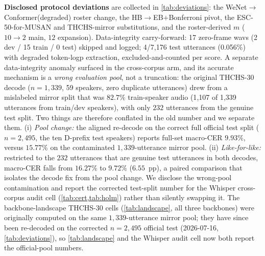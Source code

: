 \documentclass[11pt]{article}
\begin{document}
\textbf{Disclosed protocol deviations} are collected in \cref{tab:deviations}: the
WeNet$\to$Conformer(degraded) roster change, the HB$\to$EB$+$Bonferroni pivot, the
ESC-50-for-MUSAN and THCHS-mirror substitutions, and the roster-derived $m$
($10\to2$ main, $12$ expansion). Data-integrity carry-forward: 17 zero-frame wavs
(2 dev / 15 train / 0 test) skipped and logged; 4/7{,}176 test utterances (0.056\%)
with degraded token-logp extraction, excluded-and-counted per score. A separate
data-integrity anomaly surfaced in the cross-corpus arm, and its accurate mechanism is a
\emph{wrong evaluation pool}, not a truncation: the original THCHS-30 decode ($n=1{,}339$,
59 speakers, zero duplicate utterances) drew from a mislabeled mirror split that was
$82.7\%$ train-speaker audio (1{,}107 of 1{,}339 utterances from train/dev speakers),
with only $232$ utterances from the genuine test split. Two things are therefore
conflated in the old number and we separate them. (i) \emph{Pool change:} the aligned
re-decode on the correct full official test split ($n=2{,}495$, the ten D-prefix test
speakers) reports full-set macro-CER $9.93\%$, versus $15.77\%$ on the contaminated
$1{,}339$-utterance mirror pool. (ii) \emph{Like-for-like:} restricted to the $232$
utterances that are genuine test utterances in both decodes, macro-CER falls from
$16.27\%$ to $9.72\%$ ($6.55$~pp), a paired comparison that isolates the decode fix from
the pool change. We disclose the wrong-pool contamination and report the corrected
test-split number for the Whisper cross-corpus audit cell (\cref{tab:cert,tab:holm}) rather
than silently swapping it. The backbone-landscape THCHS-30 cells (\cref{tab:landscape},
all three backbones) were originally computed on the same $1{,}339$-utterance mirror pool;
they have since been re-decoded on the corrected $n{=}2{,}495$ official test (2026-07-16,
\cref{tab:deviations}), so \cref{tab:landscape} and the Whisper audit cell now both report
the official-pool numbers.
\end{document}
